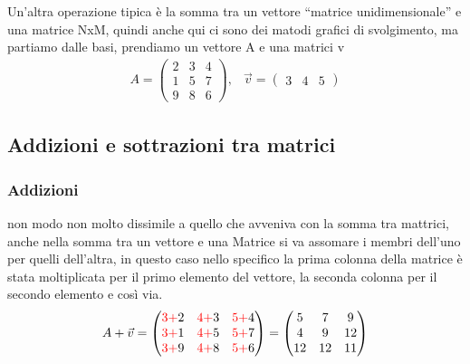 Un'altra operazione tipica è la somma tra un vettore ``matrice unidimensionale''
e una matrice NxM, quindi anche qui ci sono dei matodi grafici di svolgimento,
ma partiamo dalle basi, prendiamo un vettore A e una matrici v
\begin{eqnarray}
  \label{eq:vetmatex}
  A =
  \begin{pmatrix}
    2 & 3 & 4\\
    1 & 5 & 7\\
    9 & 8 & 6        
  \end{pmatrix}, & \vec{v}=
                  \begin{pmatrix}
                    3 & 4 & 5
                  \end{pmatrix}
\end{eqnarray}
\clearpage
\subsection{Addizioni e sottrazioni tra matrici}
\label{sec:addesottvandmtx}

\subsubsection{Addizioni}
\label{sec:addvectmtx}
non modo non molto dissimile a quello che avveniva con la somma tra mattrici,
anche nella somma tra un vettore e una Matrice si va assomare i membri dell'uno
per quelli dell'altra, in questo caso nello specifico la prima colonna della
matrice è stata moltiplicata per il primo elemento del vettore, la seconda
colonna per il secondo elemento e così via.
\begin{eqnarray*}
   A+\vec{v} =
  \begin{pmatrix}
    {\color{red}3+}2 & {\color{red}4+}3 & {\color{red}5+}4\\
    {\color{red}3+}1 & {\color{red}4+}5 & {\color{red}5+}7\\
    {\color{red}3+}9 & {\color{red}4+}8 & {\color{red}5+}6        
  \end{pmatrix}=
  \begin{pmatrix}
    5 & 7 & 9\\
    4 & 9 & 12\\
    12 & 12 & 11
  \end{pmatrix}
\end{eqnarray*}

